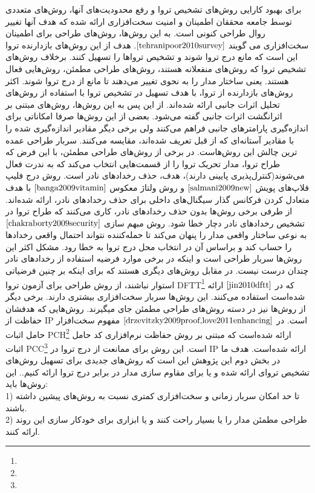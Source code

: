 برای بهبود کارایی روش‌های تشخیص تروا و رفع محدودیت‌های آنها، روش‌های متعددی توسط جامعه محققان اطمینان و امنیت سخت‌افزاری ارائه شده که هدف آنها تغییر روال طراحی کنونی است. به این روش‌ها، روش‌های طراحی برای اطمینان  سخت‌افزاری می گویند $\cite{tehranipoor2010survey}$. هدف از این روش‌های بازدارنده تروا این است که مانع درج تروا  شوند و تشخیص تروا‌ها را تسهیل کنند. برخلاف روش‌های تشخیص تروا که روش‌های منفعلانه هستند، روش‌های طراحی مطمئن، روش‌هایی فعال هستند. یعنی ساختار مدار را به نحوی تغییر می‌دهند تا مانع از درج تروا شوند.
اکثر روش‌های بازدارنده از تروا، با هدف تسهیل در تشخیص تروا با استفاده از روش‌های تحلیل اثرات جانبی ارائه شده‌اند. از این پس به این روش‌ها، روش‌های مبتنی بر اثرانگشت  اثرات جانبی گفته می‌شود. بعضی از این روش‌ها صرفا امکاناتی برای اندازه‌گیری پارامترهای جانبی فراهم می‌کنند ولی برخی دیگر مقادیر اندازه‌گیری شده را با مقادیر آستانه‌ای که از قبل تعریف شده‌اند، مقایسه می‌کنند. سربار طراحی عمده ترین چالش این روش‌هاست. 
در برخی از روش‌های طراحی مطمئن، با این فرض که طراح تروا، مدار تحریک تروا را از قسمت‌هایی انتخاب می‌کند که به ندرت فعال می‌شوند(کنترل‌پذیری پایینی دارند)، هدف، حذف رخدادهای نادر است. روش درج فلیپ فلاپ‌های پویش $\cite{salmani2009new}$ و روش ولتاژ معکوس $\cite{banga2009vitamin}$ با هدف متعادل کردن فرکانس گذار سیگنال‌های داخلی برای حذف رخدادهای نادر، ارائه شده‌اند. از طرفی برخی روش‌ها بدون حذف رخدادهای نادر، کاری می‌کنند که طراح تروا در تشخیص رخدادهای نادر دچار خطا شود. روش مبهم سازی
$\cite{chakraborty2009security}$
به نوعی ساختار واقعی مدار را پنهان می‌کند تا حمله‌کننده نتواند احتمال واقعی رخدادها را حساب کند و براساس آن در انتخاب محل درج تروا به خطا رود. مشکل اکثر این روش‌ها سربار طراحی است و اینکه در برخی موارد فرضیه استفاده از رخدادهای نادر چندان درست نیست. در مقابل روش‌های دیگری هستند که برای اینکه بر چنین فرضیاتی استوار نباشند، از روش طراحی برای آزمون تروا  DFTT\footnote{} که در $\cite{jin2010dftt}$ ارائه شده‌است استفاده می‌کنند. این روش‌ها سربار سخت‌افزاری بیشتری دارند.
برخی دیگر از روش‌ها نیز در دسته روش‌های طراحی مطمئن جای میگیرند. روش‌هایی که هدفشان حفاظت از IP‌ است. در
$\cite{drzevitzky2009proof,love2011enhancing}$
مفهوم سخت‌افزار حامل اثبات PCH\footnote{}  ارائه شده‌است که مبتنی بر روش حفاظت نرم‌افزاری کد حامل اثبات PCC\footnote{} است. این روش برای ممانعت از درج تروا در IP‌ ارائه شده‌است.
هدف ما در بخش دوم این پژوهش این است که روش‌های جدیدی برای تسهیل روش‌های تشخیص تروای ارائه شده و یا برای مقاوم سازی مدار در برابر درج تروا ارائه کنیم.. این روش‌ها باید:
\\
1) تا حد امکان سربار زمانی و سخت‌افزاری کمتری نسبت به روش‌های پیشین داشته باشند.
\\
2) طراحی مطمئن مدار را یا بسیار راحت کنند و یا ابزاری برای خودکار سازی این روند ارائه کنند. 




